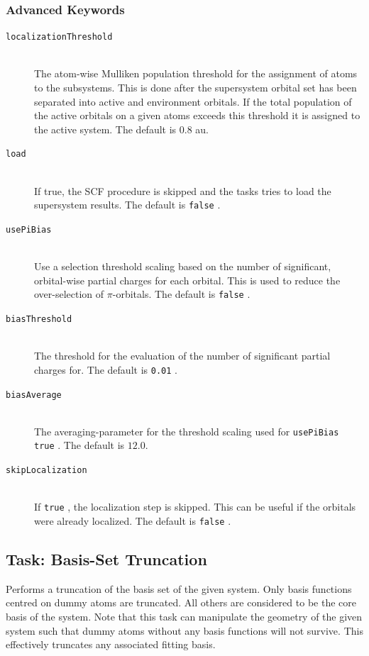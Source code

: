 \documentclass[bibliography=totocnumbered,a4paper,10pt,oneside]{scrbook}
\newcommand{\ttt}[1]{%
  \begingroup\setlength{\fboxsep}{1pt}%
  \colorbox{serenity-green!30}{\texttt{\hspace*{2pt}\vphantom{(g}#1\hspace*{2pt}}}%
  \endgroup
}
\begin{document}
\subsubsection{Advanced Keywords}
\begin{description}
    \item [\texttt{localizationThreshold}]\hfill \\
    The atom-wise Mulliken population threshold for the assignment of atoms to the subsystems. This is done
    after the supersystem orbital set has been separated into active and environment orbitals. If the total
    population of the active orbitals on a given atoms exceeds this threshold it is assigned to the active
    system. The default is $0.8$ au.
    \item [\texttt{load}]\hfill \\
    If true, the SCF procedure is skipped and the tasks tries to load the supersystem results. The default
    is \ttt{false}.
    \item [\texttt{usePiBias}]\hfill \\
    Use a selection threshold scaling based on the number of significant, orbital-wise partial charges for
    each orbital. This is used to reduce the over-selection of $\pi$-orbitals. The default is \ttt{false}.
    \item [\texttt{biasThreshold}]\hfill \\
    The threshold for the evaluation of the number of significant partial charges for. The default is
    \ttt{0.01}.
    \item [\texttt{biasAverage}]\hfill \\
    The averaging-parameter for the threshold scaling used for \ttt{usePiBias true}.
    The default is $12.0$.
    \item [\texttt{skipLocalization}]\hfill \\
    If \ttt{true}, the localization step is skipped. This can be useful if the orbitals were already
    localized. The default is \ttt{false}.
 \end{description}


\subsection{Task: Basis-Set Truncation\label{task:truncation}}
Performs a truncation of the basis set of the given system. Only basis functions centred
on dummy atoms are truncated. All others are considered to be the core basis of the
system. Note that this task can manipulate the geometry of the given system such that 
dummy atoms without any basis functions will not survive. This effectively truncates any associated 
fitting basis.
\end{document}
